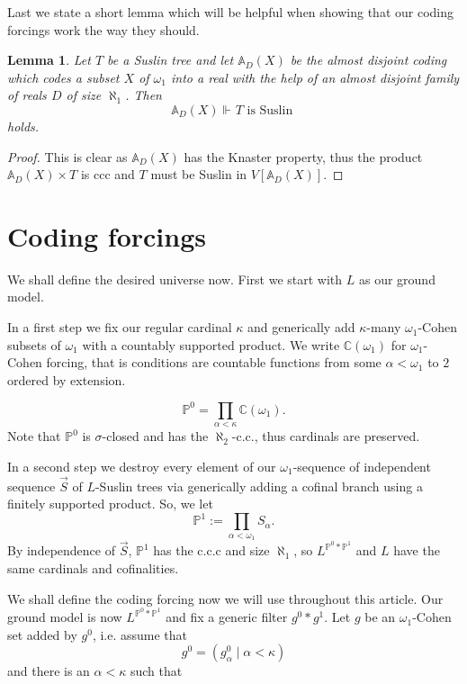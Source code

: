 \documentclass[a4paper,11pt]{article}
\newtheorem{lemma}[theorem]{Lemma}
\newcommand{\forceP}{\mathbb{P}}
\begin{document}
Last we state a short lemma which will be helpful when showing that our coding forcings work the way they should.
\begin{lemma}\label{a.d.coding preserves Suslin trees}
 Let $T$ be a Suslin tree and let $\mathbb{A}_D(X)$ be the almost disjoint coding which codes
 a subset $X$ of $\omega_1$ into a real with the help of an almost disjoint family
 of reals $D$ of size $\aleph_1$. Then $$\mathbb{A}_{D}(X) \Vdash_{} T \text{ is Suslin }$$
 holds.
\end{lemma}
\begin{proof}
 This is clear as $\mathbb{A}_{D}(X)$ has the Knaster property, thus the product $\mathbb{A}_{D}(X) \times T$ is ccc and $T$ must be Suslin in $V[{\mathbb{A}_{D}(X)}]$. 
\end{proof}







\section{Coding forcings}
We shall define the desired universe now. First we start with $L$ as our ground model.

In a first step we fix our regular cardinal $\kappa$ and generically add $\kappa$-many
$\omega_1$-Cohen subsets of $\omega_1$ with a countably supported product. We write $\mathbb{C} (\omega_1)$ for $\omega_1$-Cohen forcing, that is conditions are countable functions from some $\alpha < \omega_1$ to $2$ ordered by extension.

\[ \forceP^0= \prod_{\alpha < \kappa} \mathbb{C} (\omega_1). \]
Note that $\forceP^0$ is $\sigma$-closed and has the $\aleph_2$-c.c., thus cardinals are preserved.

In a second step we destroy every element of our $\omega_1$-sequence of independent sequence $\vec{S}$ of $L$-Suslin trees via generically adding a cofinal branch using a finitely supported product. 
So,  we let
\[ \forceP^1:= \prod_{\alpha <\omega_1} S_{\alpha}. \]
By independence of $\vec{S}$, $\forceP^1$ has the c.c.c and size $\aleph_1$, so $L^{\forceP^0\ast \forceP^1}$ and $L$ have the same cardinals and cofinalities.



We shall define the coding forcing now we will use throughout this article.
Our ground model is now $L^{\forceP^0 \ast \forceP^1}$ and fix a generic filter $g^0 \ast g^1$.  Let $g$ be an $\omega_1$-Cohen set added by $g^0$, i.e. assume that \[g^0= (g^0_{\alpha} \mid \alpha < \kappa )\] and there is an $\alpha < \kappa$ such that
\end{document}
